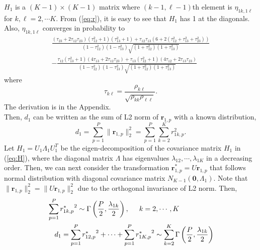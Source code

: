 \documentclass[aap, preprint]{imsart}
\numberwithin{equation}{section}
\theoremstyle{plain}
\begin{document}
$H_1$ is a $(K-1) \times (K-1)$ matrix where $(k-1, \ell-1)$th element is $\eta_{1k, 1\ell}$ for $k, \ell = 2, \cdots K$. From (\ref{eq:r}), it is easy to see that $H_1$ has 1 at the diagonals. Also, $\eta_{1k, 1\ell}$ converges in probability to
\begin{equation} \begin{multlined}
\frac{(\tau_{23}+2\tau_{12}\tau_{23})(\tau_{12}^2+1)(\tau_{13}^2+1) + \tau_{12}\tau_{13}(6+2(\tau_{12}^2+\tau_{13}^2+\tau_{23}^2))}{(1-{\tau}_{12}^2)(1-{\tau}_{13}^2)\sqrt{(1+{\tau}_{12}^2)(1+{\tau}_{13}^2)}} \\
- \frac{\tau_{12}(\tau_{13}^2+1)(4\tau_{13}+2\tau_{12}\tau_{23}) + \tau_{13}(\tau_{12}^2+1)(4\tau_{12}+2\tau_{13}\tau_{23})}{(1-{\tau}_{12}^2)(1-{\tau}_{13}^2)\sqrt{(1+{\tau}_{12}^2)(1+{\tau}_{13}^2)}}
\label{eq:eta}
\end{multlined} \end{equation}
where 
$${\tau}_{k\ell}= \frac{\rho_{k\ell}}{\sqrt{{\rho}_{kk}{\rho}_{\ell\ell}}}. $$
The derivation is in the Appendix. \\

Then, $d_1$ can be written as the sum of L2 norm of $\bm{r}_{1,p}$ with a known distribution, 
\begin{equation}
d_1 = \sum_{p=1}^{P} \|\bm{r}_{1,p}\|_2^2 = \sum_{p=1}^{P} \sum_{k=2}^K r_{1k,p}^2.
\label{eq:d2}
\end{equation}
Let $H_1 = U_1 \Lambda_1 U_1^T$ be the eigen-decomposition of the covariance matrix $H_1$ in (\ref{eq:H}), where the diagonal matrix $\Lambda$ has eigenvalues $\lambda_{12}, \cdots, \lambda_{1K}$ in a decreasing order. Then, we can next consider the transformation $\bm{r}_{1,p}^* = U\bm{r}_{1,p}$ that follows normal distribution with diagonal covariance matrix $N_{K-1}(\bm{0}, \Lambda_1)$. Note that $\|\bm{r}_{1,p}\|_2^2 = \|U\bm{r}_{1,p}\|_2^2$ due to the orthogonal invariance of L2 norm. Then,
\begin{equation}
    \begin{multlined}
    \sum_{p=1}^{P} {r_{1k,p}^*}^2 \sim \Gamma \left( \frac{P}{2}, \frac{\lambda_{1k}}{2} \right), \hspace{5mm} k = 2, \cdots, K\\
    d_1 =  \sum_{p=1}^{P} {r_{12,p}^*}^2 + \cdots +\sum_{p=1}^P{r_{1K,p}^*}^2 \sim \sum_{k=2}^{K} \Gamma \left( \frac{P}{2}, \frac{\lambda_{1k}}{2}\right)
    \end{multlined}
    \label{eq:d_dist}
\end{equation}
\end{document}
